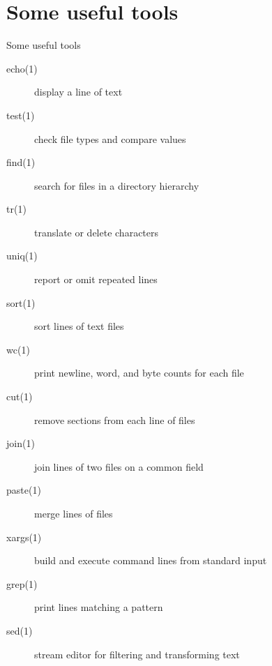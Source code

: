 \documentclass{beamer}
\begin{document}
\section{Some useful tools}
\begin{frame}{Some useful tools}
	\begin{description}
		\item[echo(1)] display a line of text
		\item[test(1)] check file types and compare values
		\item[find(1)] search for files in a directory hierarchy
		\item[tr(1)] translate or delete characters
		\item[uniq(1)] report or omit repeated lines
		\item[sort(1)] sort lines of text files
		\item[wc(1)] print newline, word, and byte counts for each file
		\item[cut(1)] remove sections from each line of files
		\item[join(1)] join lines of two files on a common field
		\item[paste(1)] merge lines of files
		\item[xargs(1)] build and execute command lines from standard input
		\item[grep(1)] print lines matching a pattern
		\item[sed(1)] stream editor for filtering and transforming text
	\end{description}
\end{frame}
\end{document}
